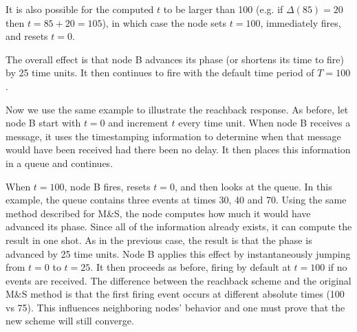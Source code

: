 {It is also possible for the computed $t$ to be larger than 100
(e.g. if $\Delta(85)=20$ then $t=85+20=105$), in which case the node
sets $t=100$, immediately fires, and resets $t=0$.

The overall effect is that node B advances its phase (or shortens
its time to fire) by 25 time units. It then continues to fire with the
default time period of $T=100$.


Now we use the same example to illustrate the reachback response. As
before, let node B start with $t=0$ and increment $t$ every time
unit. When node B receives a message, it uses the timestamping
information to determine when that message would have been received
had there been no delay. It then places this information in a queue
and continues.

When $t=100$, node B fires, resets $t=0$, and then looks at the
queue. In this example, the queue contains three events at times 30,
40 and 70. Using the same method described for M\&S, the node computes
how much it would have advanced its phase. Since all of the
information already exists, it can compute the result in one shot.  As
in the previous case, the result is that the phase is advanced by 25
time units. Node B applies this effect by instantaneously jumping from
$t=0$ to $t=25$. It then proceeds as before, firing by default at
$t=100$ if no events are received. The difference between the
reachback scheme and the original M\&S method is that the first firing
event occurs at different absolute times (100 vs 75). This influences
neighboring nodes' behavior and one must prove that the new scheme will
still converge.





}
